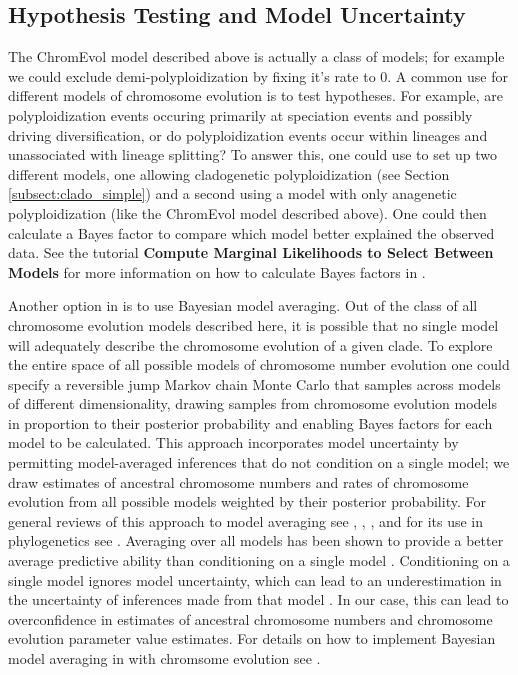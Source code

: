 \subsection{Hypothesis Testing and Model Uncertainty}

The ChromEvol model described above is actually a class of models;
for example we could exclude demi-polyploidization by fixing it's rate to 0.
A common use for different models of chromosome evolution is to test hypotheses.
For example, are polyploidization events
occuring primarily at speciation events and possibly driving diversification,
or do polyploidization events occur within lineages and unassociated with lineage splitting?
To answer this, one could use \RevBayes to set up two different models, one allowing cladogenetic
polyploidization (see Section \ref{subsect:clado_simple}) and a second
using a model with only anagenetic polyploidization (like the ChromEvol model described above).
One could then calculate a Bayes factor to compare which model better explained the observed data.
See the \RevBayes tutorial \textbf{Compute Marginal Likelihoods to Select Between Models}
for more information on how to calculate Bayes factors in \RevBayes.


Another option in \RevBayes is to use Bayesian model averaging.
Out of the class of all chromosome evolution models
described here, it is possible that no single model
will adequately describe the chromosome evolution
of a given clade.
To explore the entire space of all possible models of chromosome number evolution 
one could specify a reversible jump Markov chain Monte Carlo \citep{green1995reversible} that samples across models of different dimensionality,
drawing samples
from chromosome evolution models in proportion to their posterior probability and
enabling Bayes factors for each model to be calculated.
This approach incorporates model uncertainty
by permitting model-averaged inferences that do not condition on a single model;
we draw estimates of ancestral chromosome numbers and rates of chromosome evolution
from all possible models weighted by their posterior probability.
For general reviews of this approach to model averaging see
\cite{madigan1994model}, \cite{hoeting1999bayesian}, \cite{kass1995bayes},
and for its use in phylogenetics see \citet{posada2004model}.
Averaging over all models has been shown to
provide a better average predictive ability
than conditioning on a single model
\citep{madigan1994model}.
Conditioning on a single model ignores model uncertainty,
which can lead to an underestimation in the uncertainty
of inferences made from that model \citep{hoeting1999bayesian}.
In our case, this can lead to overconfidence in estimates
of ancestral chromosome numbers and chromosome
evolution parameter value estimates.
For details on how to implement Bayesian model averaging in \RevBayes
with chromsome evolution see \citet{freyman2016cladogenetic}.



